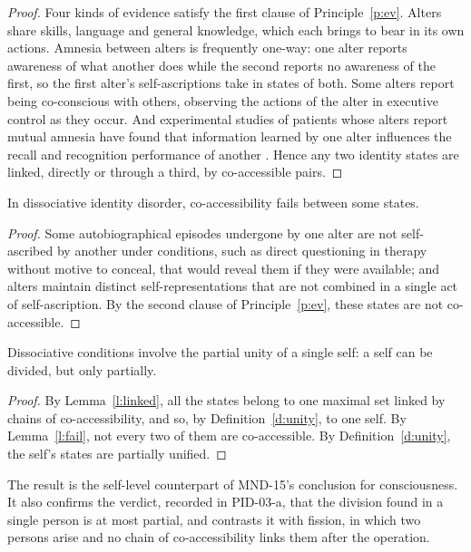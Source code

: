 \documentclass{situationist-preprint}
\begin{document}
\begin{proof}
Four kinds of evidence satisfy the first clause of Principle~\ref{p:ev}. Alters share skills, language and general knowledge, which each brings to bear in its own actions. Amnesia between alters is frequently one-way: one alter reports awareness of what another does while the second reports no awareness of the first, so the first alter's self-ascriptions take in states of both. Some alters report being co-conscious with others, observing the actions of the alter in executive control as they occur. And experimental studies of patients whose alters report mutual amnesia have found that information learned by one alter influences the recall and recognition performance of another \citep{Huntjens2003}. Hence any two identity states are linked, directly or through a third, by co-accessible pairs.
\end{proof}

\begin{lemma}\label{l:fail}
In dissociative identity disorder, co-accessibility fails between some states.
\end{lemma}

\begin{proof}
Some autobiographical episodes undergone by one alter are not self-ascribed by another under conditions, such as direct questioning in therapy without motive to conceal, that would reveal them if they were available; and alters maintain distinct self-representations that are not combined in a single act of self-ascription. By the second clause of Principle~\ref{p:ev}, these states are not co-accessible.
\end{proof}

\begin{theorem}\label{t:main}
Dissociative conditions involve the partial unity of a single self: a self can be divided, but only partially.
\end{theorem}

\begin{proof}
By Lemma~\ref{l:linked}, all the states belong to one maximal set linked by chains of co-accessibility, and so, by Definition~\ref{d:unity}, to one self. By Lemma~\ref{l:fail}, not every two of them are co-accessible. By Definition~\ref{d:unity}, the self's states are partially unified.
\end{proof}

The result is the self-level counterpart of MND-15's conclusion for consciousness. It also confirms the verdict, recorded in PID-03-a, that the division found in a single person is at most partial, and contrasts it with fission, in which two persons arise and no chain of co-accessibility links them after the operation.
\end{document}
